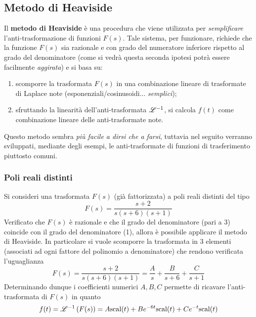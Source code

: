 	\subsection{Metodo di Heaviside} \label{sec:class:heaviside}
		\begin{concetto}
			Il \textbf{metodo di Heaviside} è una procedura che viene utilizzata per \textit{semplificare} l'anti-trasformazione di funzioni $F(s)$. Tale sistema, per funzionare, richiede che la funzione $F(s)$ sia razionale e con grado del numeratore inferiore rispetto al grado del denominatore (come si vedrà questa seconda ipotesi potrà essere facilmente \textit{aggirata}) e si basa su:
			\begin{enumerate}
				\item scomporre la trasformata $F(s)$ in una combinazione lineare di trasformate di Laplace note (esponenziali/cosinusoidi... \textit{semplici});
				\item sfruttando la linearità dell'anti-trasformata $\mathscr {L}^{-1}$, si calcola $f(t)$ come combinazione lineare delle anti-trasformate note.
			\end{enumerate}
		\end{concetto}	
		Questo metodo sembra \textit{più facile a dirsi che a farsi}, tuttavia nel seguito verranno sviluppati, mediante degli esempi, le anti-trasformate di funzioni di trasferimento piuttosto comuni.
		
		\subsubsection{Poli reali distinti}
			Si consideri una trasformata $F(s)$ (già fattorizzata) a poli reali distinti del tipo
			\[F(s) = \frac{s+2}{s(s+6)(s+1)}\]
			Verificato che $F(s)$ è razionale e che il grado del denominatore (pari a 3) coincide con il grado del denominatore (1), allora è possibile applicare il metodo di Heaviside. In particolare si vuole scomporre la trasformata in 3 elementi (associati ad ogni fattore del polinomio a denominatore) che rendono verificata l'uguaglianza
			\[ F(s) = \frac{s+2}{s(s+6)(s+1)} = \frac A s + \frac{B}{s+6} + \frac{C}{s+1}  \]
			Determinando dunque i coefficienti numerici $A,B,C$ permette di ricavare l'anti-trasformata di $F(s)$ in quanto
			\[ f(t) = \mathscr {L}^{-1} \left( F(s) \right) = A\textrm{scal}(t) + Be^{-6t}\textrm{scal}(t) + C e^{-t}\textrm{scal}(t) \]
			

